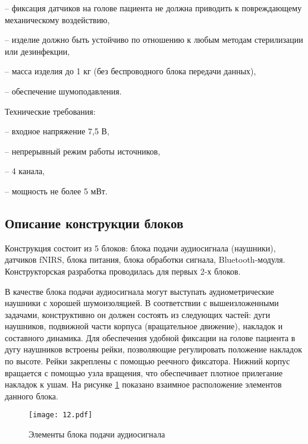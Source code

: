 – фиксация датчиков на голове пациента не должна приводить к повреждающему механическому воздействию,

– изделие должно быть устойчиво по отношению к любым методам стерилизации или дезинфекции,

– масса изделия до 1 кг (без беспроводного блока передачи данных),

– обеспечение шумоподавления.

Технические требования:

– входное напряжение 7,5 В,

– непрерывный режим работы источников,

– 4 канала,

– мощность не более 5 мВт.


\subsection{Описание конструкции блоков}
Конструкция состоит из 5 блоков: блока подачи аудиосигнала (наушники), датчиков fNIRS, блока питания, блока обработки сигнала, Bluetooth-модуля. Конструкторская разработка проводилась для первых 2-х блоков.

В качестве блока подачи аудиосигнала могут выступать аудиометрические наушники с хорошей шумоизоляцией. В соответствии с вышеизложенными задачами, конструктивно он должен состоять из следующих частей: дуги наушников, подвижной части корпуса (вращательное движение), накладок и составного динамика. Для обеспечения удобной фиксации на голове пациента в дугу наушников встроены рейки, позволяющие регулировать положение накладок по высоте. Рейки закреплены с помощью реечного фиксатора. Нижний корпус вращается с помощью узла вращения, что обеспечивает плотное прилегание накладок к ушам. На рисунке \ref{ushi} показано взаимное расположение элементов данного блока.

\begin{figure}[!h]
\begin{center}
\texttt{[image: 12.pdf]}
\caption{\centering Элементы блока подачи аудиосигнала}
\label{ushi}
\end{center}
\end{figure}

